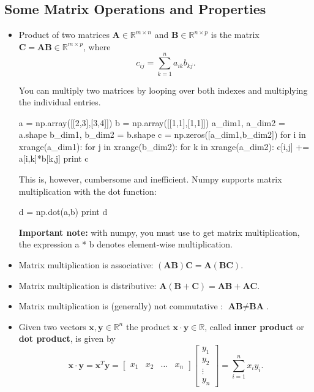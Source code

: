 \subsection{Some Matrix Operations and Properties}
\begin{itemize}
\item Product of two matrices $\textbf{A} \in \mathbb{R}^{m\times n}$ and $\textbf{B} \in \mathbb{R}^{n\times p}$
is the matrix $\textbf{C}=\textbf{AB} \in \mathbb{R}^{m\times p}$, where 
\begin{equation*}
c_{ij}=\sum\limits_{k=1}^{n}a_{ik}b_{kj}.
\end{equation*}

\begin{exercise}
You can multiply two matrices by looping over both indexes and multiplying the individual entries.
\begin{python}
a = np.array([[2,3],[3,4]])
b = np.array([[1,1],[1,1]])
a_dim1, a_dim2 = a.shape
b_dim1, b_dim2 = b.shape
c = np.zeros([a_dim1,b_dim2])
for i in xrange(a_dim1):
   for j in xrange(b_dim2):
       for k in xrange(a_dim2):
          c[i,j] += a[i,k]*b[k,j]
print c
\end{python}

This is, however, cumbersome and inefficient. Numpy supports matrix multiplication with the dot function:

\begin{python}
d = np.dot(a,b)
print d
\end{python}

\textbf{Important note:} with numpy, you must use  to get matrix multiplication, the expression {a * b} denotes element-wise multiplication.
\end{exercise}

\item Matrix multiplication is associative: $(\textbf{AB})\textbf{C}= \textbf{A}(\textbf{BC})$.
\item Matrix multiplication is distributive: $\textbf{A}(\textbf{B}+\textbf{C})= \textbf{AB} + \textbf{AC}$.
\item Matrix multiplication is (generally) not commutative : $\textbf{AB} \neq \textbf{BA}$.
\item Given two vectors $\textbf{x},\textbf{y} \in \mathbb{R}^{n}$ the product $\textbf{x} \cdot \textbf{y} \in \mathbb{R}$, %
 called {\bf inner product}
or {\bf dot product}, is given by
\begin{equation*}
\textbf{x} \cdot \textbf{y} = \textbf{x}^{T}\textbf{y} = \left[\begin{array}{cccc}
x_{1}&x_{2}&\ldots&x_{n}\end{array}\right] \left[\begin{array}{c}
y_{1} \\
y_{2} \\
\vdots \\
y_{n}
\end{array}\right] = \sum\limits_{i=1}^{n}x_{i}y_{i}.
\end{equation*}


\end{itemize}
